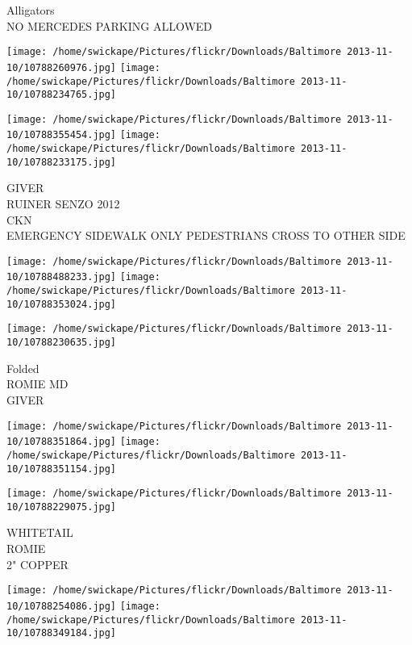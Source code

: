 \documentclass[10pt,letterpaper]{article}
\begin{document}
Alligators\\
NO MERCEDES PARKING ALLOWED\\
\pagebreak

\texttt{[image: /home/swickape/Pictures/flickr/Downloads/Baltimore 2013-11-10/10788260976.jpg]}
\texttt{[image: /home/swickape/Pictures/flickr/Downloads/Baltimore 2013-11-10/10788234765.jpg]}

\texttt{[image: /home/swickape/Pictures/flickr/Downloads/Baltimore 2013-11-10/10788355454.jpg]}
\texttt{[image: /home/swickape/Pictures/flickr/Downloads/Baltimore 2013-11-10/10788233175.jpg]}

GIVER\\
RUINER SENZO 2012\\
CKN\\
EMERGENCY SIDEWALK ONLY PEDESTRIANS CROSS TO OTHER SIDE\\
\pagebreak

\texttt{[image: /home/swickape/Pictures/flickr/Downloads/Baltimore 2013-11-10/10788488233.jpg]}
\texttt{[image: /home/swickape/Pictures/flickr/Downloads/Baltimore 2013-11-10/10788353024.jpg]}

\vspace{0.25in}
\texttt{[image: /home/swickape/Pictures/flickr/Downloads/Baltimore 2013-11-10/10788230635.jpg]}

Folded\\
ROMIE MD\\
GIVER\\
\pagebreak

\texttt{[image: /home/swickape/Pictures/flickr/Downloads/Baltimore 2013-11-10/10788351864.jpg]}
\texttt{[image: /home/swickape/Pictures/flickr/Downloads/Baltimore 2013-11-10/10788351154.jpg]}

\vspace{0.25in}
\texttt{[image: /home/swickape/Pictures/flickr/Downloads/Baltimore 2013-11-10/10788229075.jpg]}

WHITETAIL\\
ROMIE\\
2" COPPER\\
\pagebreak

\texttt{[image: /home/swickape/Pictures/flickr/Downloads/Baltimore 2013-11-10/10788254086.jpg]}
\texttt{[image: /home/swickape/Pictures/flickr/Downloads/Baltimore 2013-11-10/10788349184.jpg]}
\end{document}
